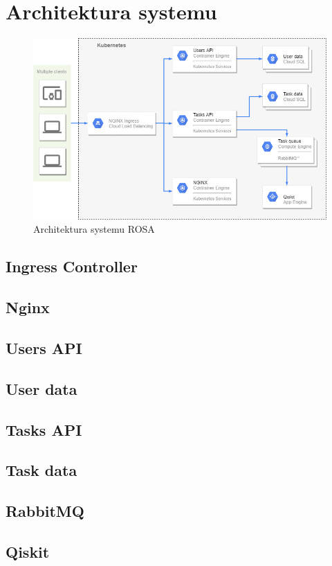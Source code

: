 \newpage
\chapter{Architektura systemu}
\begin{figure}[!ht]
    \centering
    \includegraphics[width=\textwidth]{images/RSO_arch.png}
    \caption{Architektura systemu ROSA}
    \label{fig:sys_arch}
\end{figure}
\section{Ingress Controller}
\lipsum[1]
\section{Nginx}
\lipsum[1]
\section{Users API}
\lipsum[1]
\section{User data}
\lipsum[1]
\section{Tasks API}
\lipsum[1]
\section{Task data}
\lipsum[1]
\section{RabbitMQ}
\lipsum[1]
\section{Qiskit}
\lipsum[1]

